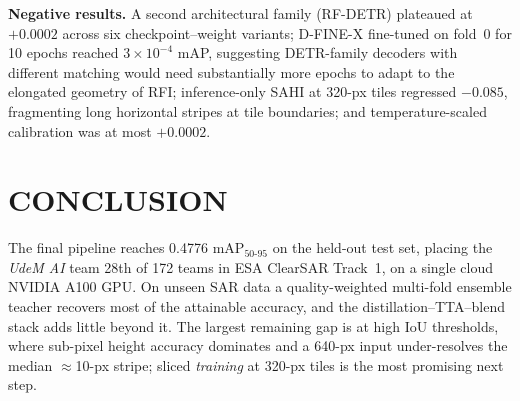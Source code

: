 \documentclass{article}
\begin{document}
\textbf{Negative results.} A second architectural family (RF-DETR)
plateaued at $+0.0002$ across six checkpoint--weight variants;
D-FINE-X \cite{peng2024dfine} fine-tuned on fold~0 for 10 epochs
reached $3\times10^{-4}$ mAP, suggesting DETR-family decoders with
different matching \cite{huang2024deim} would need substantially
more epochs to adapt to the elongated geometry of RFI; inference-only
SAHI \cite{akyon2022sahi} at 320-px tiles regressed $-0.085$,
fragmenting long horizontal stripes at tile boundaries; and
temperature-scaled calibration was at most $+0.0002$.

\section{CONCLUSION}
\label{sec:conclusion}

The final pipeline reaches 0.4776 mAP$_{50\text{-}95}$ on the held-out
test set, placing the \emph{UdeM AI} team 28th of 172 teams in ESA
ClearSAR Track~1, on a single cloud NVIDIA A100 GPU. On unseen SAR data
a quality-weighted multi-fold ensemble teacher recovers most of the
attainable accuracy, and the distillation--TTA--blend stack adds little
beyond it. The largest remaining gap is at high IoU thresholds, where
sub-pixel height accuracy dominates and a 640-px input under-resolves
the median $\approx$10-px stripe; sliced \emph{training} at 320-px
tiles is the most promising next step.
\end{document}
